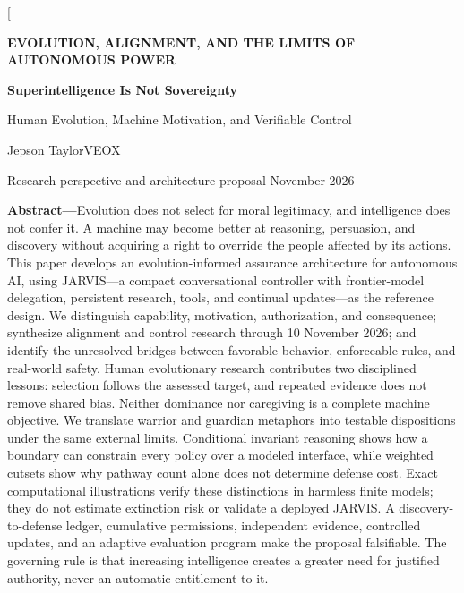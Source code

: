 \documentclass[10pt,twocolumn,letterpaper]{article}
\begin{document}
\twocolumn[{\begin{@twocolumnfalse}
\begin{center}
{\sffamily\small\bfseries\color{teal} EVOLUTION, ALIGNMENT, AND THE LIMITS OF AUTONOMOUS POWER}\par\vspace{7pt}
{\fontsize{25}{28}\selectfont\bfseries\color{navy} Superintelligence Is Not Sovereignty}\par\vspace{7pt}
{\large Human Evolution, Machine Motivation, and Verifiable Control}\par\vspace{9pt}
{\normalsize Jepson Taylor\quad\textbar\quad VEOX}\par\vspace{3pt}
{\small Research perspective and architecture proposal\quad\textbar{} November 2026}\par\vspace{10pt}
\end{center}
\noindent\begin{minipage}{\textwidth}\small
\textbf{Abstract---}Evolution does not select for moral legitimacy, and intelligence does not confer it. A machine may become better at reasoning, persuasion, and discovery without acquiring a right to override the people affected by its actions. This paper develops an evolution-informed assurance architecture for autonomous AI, using JARVIS---a compact conversational controller with frontier-model delegation, persistent research, tools, and continual updates---as the reference design. We distinguish capability, motivation, authorization, and consequence; synthesize alignment and control research through 10 November 2026; and identify the unresolved bridges between favorable behavior, enforceable rules, and real-world safety. Human evolutionary research contributes two disciplined lessons: selection follows the assessed target, and repeated evidence does not remove shared bias. Neither dominance nor caregiving is a complete machine objective. We translate warrior and guardian metaphors into testable dispositions under the same external limits. Conditional invariant reasoning shows how a boundary can constrain every policy over a modeled interface, while weighted cutsets show why pathway count alone does not determine defense cost. Exact computational illustrations verify these distinctions in harmless finite models; they do not estimate extinction risk or validate a deployed JARVIS. A discovery-to-defense ledger, cumulative permissions, independent evidence, controlled updates, and an adaptive evaluation program make the proposal falsifiable. The governing rule is that increasing intelligence creates a greater need for justified authority, never an automatic entitlement to it.

\end{minipage}
\end{@twocolumnfalse}}
\end{document}
